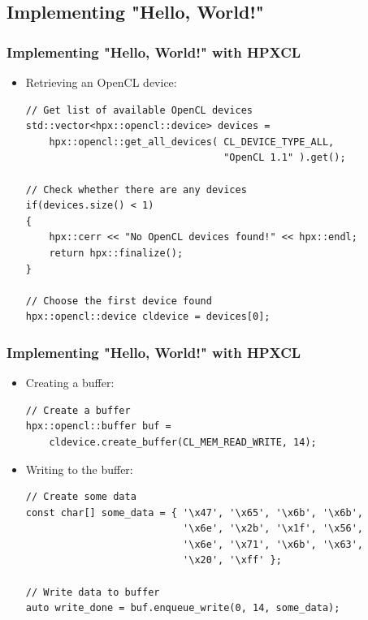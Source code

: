 \documentclass{beamer}
\begin{document}
\subsection{Implementing "Hello, World!"}
\begin{frame}[fragile]
    \frametitle{Implementing "Hello, World!" with HPXCL}
    \begin{itemize}
        \item Retrieving an OpenCL device:
        \begin{lstlisting}[firstnumber=30]
// Get list of available OpenCL devices
std::vector<hpx::opencl::device> devices =
    hpx::opencl::get_all_devices( CL_DEVICE_TYPE_ALL,
                                  "OpenCL 1.1" ).get();

// Check whether there are any devices
if(devices.size() < 1)
{
    hpx::cerr << "No OpenCL devices found!" << hpx::endl;
    return hpx::finalize();
}

// Choose the first device found
hpx::opencl::device cldevice = devices[0];
        \end{lstlisting}
    \end{itemize}
\end{frame}

\begin{frame}[fragile]
    \frametitle{Implementing "Hello, World!" with HPXCL}
    \begin{itemize}
        \item Creating a buffer:
        \begin{lstlisting}[firstnumber=40]
// Create a buffer
hpx::opencl::buffer buf =
    cldevice.create_buffer(CL_MEM_READ_WRITE, 14);
        \end{lstlisting}
        \item Writing to the buffer:
        \begin{lstlisting}[firstnumber=44]
// Create some data
const char[] some_data = { '\x47', '\x65', '\x6b', '\x6b',
                           '\x6e', '\x2b', '\x1f', '\x56',
                           '\x6e', '\x71', '\x6b', '\x63',
                           '\x20', '\xff' };

// Write data to buffer
auto write_done = buf.enqueue_write(0, 14, some_data);
        \end{lstlisting}
    \end{itemize}
\end{frame}
\end{document}
